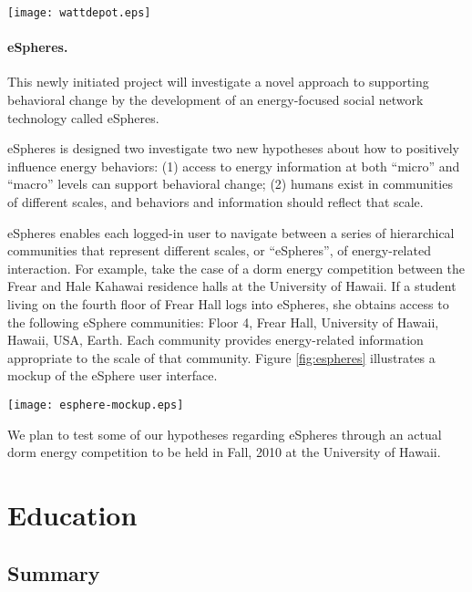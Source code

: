 \documentclass[11pt]{article}
\begin{document}
\begin{figure*}[ht]
  \center
  \texttt{[image: wattdepot.eps]}
  \caption{The WattDepot Project Home Page}
  \label{fig:wattdepot}
\end{figure*}  

\paragraph{eSpheres.}  This newly initiated project will investigate a
novel approach to supporting behavioral change by the development of an
energy-focused social network technology called eSpheres.

eSpheres is designed two investigate two new hypotheses about how to
positively influence energy behaviors: (1) access to energy information at
both ``micro'' and ``macro'' levels can support behavioral change; (2)
humans exist in communities of different scales, and behaviors and
information should reflect that scale.

eSpheres enables each logged-in user to navigate between a series of
hierarchical communities that represent different scales, or ``eSpheres'',
of energy-related interaction. For example, take the case of a dorm energy
competition between the Frear and Hale Kahawai residence halls
at the University of Hawaii. If a student living on the fourth floor of
Frear Hall logs into eSpheres, she obtains access to the following eSphere
communities: Floor 4, Frear Hall, University of Hawaii, Hawaii, USA, Earth.
Each community provides energy-related information appropriate to the scale
of that community.  Figure \ref{fig:espheres} illustrates a mockup of the
eSphere user interface.

 \begin{figure*}[ht]
  \center
  \texttt{[image: esphere-mockup.eps]}
  \caption{A mockup of one page of the eSpheres user interface}
  \label{fig:espheres}
\end{figure*}  

We plan to test some of our hypotheses regarding eSpheres through an actual
dorm energy competition to be held in Fall, 2010 at the University of
Hawaii.

\section{Education}

\subsection{Summary}
\end{document}
